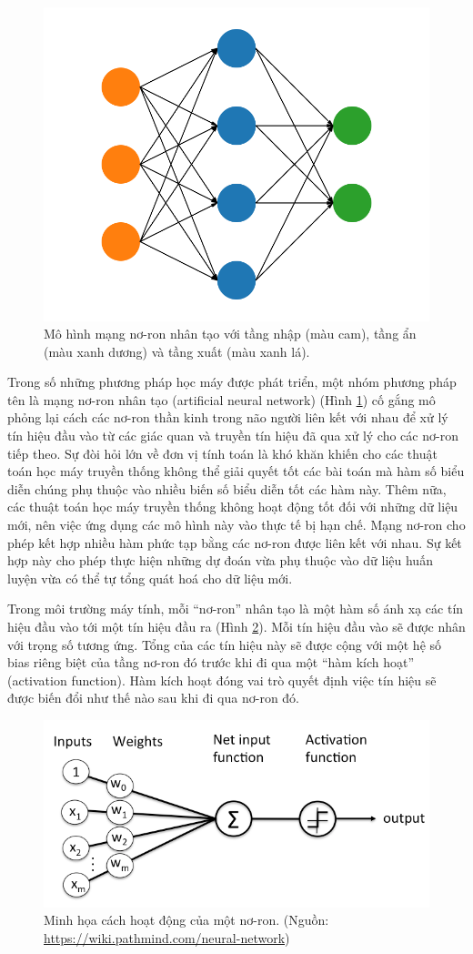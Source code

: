\begin{figure}[htp]
\centering
\includegraphics[width=80 mm]{images/ann.png}
\caption{Mô hình mạng nơ-ron nhân tạo với tầng nhập (màu cam), tầng ẩn (màu xanh dương) và tầng xuất (màu xanh lá).}
\label{fig:ann}
\end{figure}

Trong số những phương pháp học máy được phát triển, một nhóm phương pháp tên là mạng nơ-ron nhân tạo (artificial neural network) (Hình \ref{fig:ann}) cố gắng mô phỏng lại cách các nơ-ron thần kinh trong não người liên kết với nhau để xử lý tín hiệu đầu vào từ các giác quan và truyền tín hiệu đã qua xử lý cho các nơ-ron tiếp theo. Sự đòi hỏi lớn về đơn vị tính toán là khó khăn khiến cho các thuật toán học máy truyền thống không thể giải quyết tốt các bài toán mà hàm số biểu diễn chúng phụ thuộc vào nhiều biến số biểu diễn tốt các hàm này. Thêm nữa, các thuật toán học máy truyền thống không hoạt động tốt đối với những dữ liệu mới, nên việc ứng dụng các mô hình này vào thực tế bị hạn chế. Mạng nơ-ron cho phép kết hợp nhiều hàm phức tạp bằng các nơ-ron được liên kết với nhau. Sự kết hợp này cho phép thực hiện những dự đoán vừa phụ thuộc vào dữ liệu huấn luyện vừa có thể tự tổng quát hoá cho dữ liệu mới.

Trong môi trường máy tính, mỗi ``nơ-ron'' nhân tạo là một hàm số ánh xạ các tín hiệu đầu vào tới một tín hiệu đầu ra (Hình \ref{fig:perceptron-node}). Mỗi tín hiệu đầu vào sẽ được nhân với trọng số tương ứng. Tổng của các tín hiệu này sẽ được cộng với một hệ số bias riêng biệt của tầng nơ-ron đó trước khi đi qua một ``hàm kích hoạt'' (activation function). Hàm kích hoạt đóng vai trò quyết định việc tín hiệu sẽ được biến đổi như thế nào sau khi đi qua nơ-ron đó.

\begin{figure}[htp]
\centering
\includegraphics[width=120 mm]{images/perceptron-node.png}
\caption{Minh họa cách hoạt động của một nơ-ron. (Nguồn: \url{https://wiki.pathmind.com/neural-network})}
\label{fig:perceptron-node}
\end{figure}

